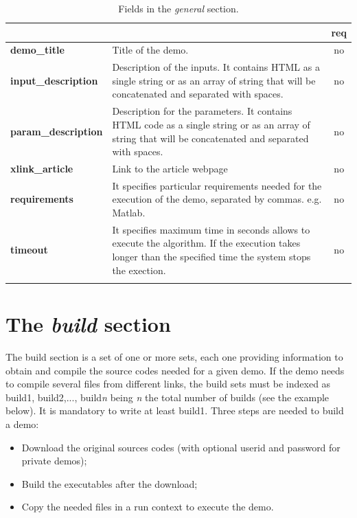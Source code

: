 % 
\begin{longtable}{|>{\bf}L{\linewidth}|L{\linewidth}|c|}
\hline
      &  & {\bf req} 
\tabularnewline \hline \hline
 demo\_title         & Title of the demo. & no\\ \hline
 input\_description  & Description of the inputs. It contains HTML as a single string or as an array of string that will be concatenated and separated with spaces. & no \\ \hline
 param\_description  & Description for the parameters. It contains HTML code as a single string or as an array of string that will be concatenated and separated with spaces. & no
\\ \hline
 xlink\_article     & Link to the article webpage & no  \\ \hline
 requirements 	    & It specifies particular requirements needed for the execution of the demo, separated by commas. e.g. Matlab. & no \\ \hline
 timeout 	    & It specifies maximum time in seconds allows to execute the algorithm. If the execution takes longer than the specified time the system stops the exection. & no \\ \hline
\caption{Fields in the \emph{general} section.}
\end{longtable}

\section{The \emph{build} section}

The build section is a set of one or more sets, each one providing information to obtain and compile the source codes needed for a given demo. If the demo needs to compile several files from different links, the build sets must be indexed as build1, build2,..., build\textit{n} being \textit{n} the total number of builds (see the example below). It is mandatory to write at least build1. Three steps are needed to build a demo: 

\begin{itemize}
  \item Download the original sources codes (with optional userid and password for private demos);
  \item Build the executables after the download;
  \item Copy the needed files in a run context to execute the  demo.
\end{itemize}

